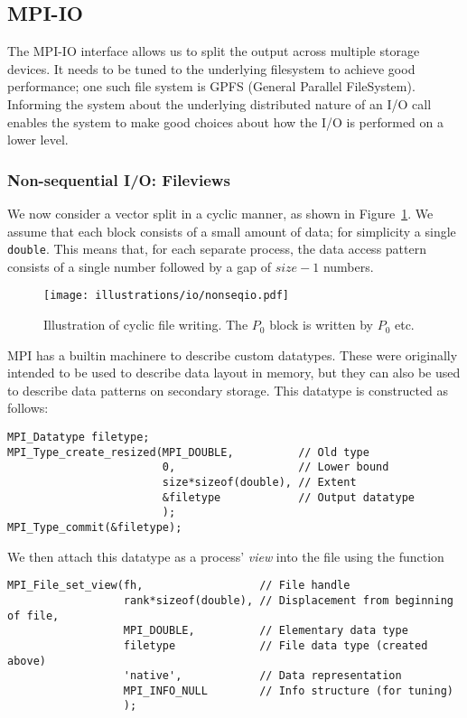 \subsection{MPI-IO} %
\label{sub:mpi_io}
The MPI-IO interface allows us to split the output across multiple storage devices. It needs to be tuned to the underlying filesystem to achieve good performance; one such file system is GPFS (General Parallel FileSystem). Informing the system about the underlying distributed nature of an I/O call enables the system to make good choices about how the I/O is performed on a lower level.


\subsubsection{Non-sequential I/O: Fileviews} %
\label{ssub:non_sequential_i_o_fileviews}
We now consider a vector split in a cyclic manner, as shown in Figure~\ref{fig:nonseqio}. We assume that each block consists of a small amount of data; for simplicity a single \texttt{double}. This means that, for each separate process, the data access pattern consists of a single number followed by a gap of $size-1$ numbers.

\begin{figure}[H]
  \centering
  \texttt{[image: illustrations/io/nonseqio.pdf]}
  \caption{Illustration of cyclic file writing. The $P_0$ block is written by $P_0$ etc.}
  \label{fig:nonseqio}
\end{figure}


MPI has a builtin machinere to describe custom datatypes. These were originally intended to be used to describe data layout in memory, but they can also be used to describe data patterns on secondary storage. This datatype is constructed as follows:
\begin{lstlisting}
MPI_Datatype filetype;
MPI_Type_create_resized(MPI_DOUBLE,          // Old type
                        0,                   // Lower bound
                        size*sizeof(double), // Extent
                        &filetype            // Output datatype
                        );
MPI_Type_commit(&filetype);
\end{lstlisting}

We then attach this datatype as a process' \emph{view} into the file using the function
\begin{lstlisting}
MPI_File_set_view(fh,                  // File handle
                  rank*sizeof(double), // Displacement from beginning of file,
                  MPI_DOUBLE,          // Elementary data type
                  filetype             // File data type (created above)
                  'native',            // Data representation
                  MPI_INFO_NULL        // Info structure (for tuning)
                  );
\end{lstlisting}

